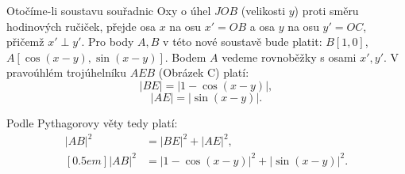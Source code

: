 \documentclass[12pt,a4paper]{article}
\begin{document}
\begin{center}
\end{center}


Otočíme-li soustavu souřadnic Oxy o úhel $JOB$ (velikosti $y$) proti směru hodinových ručiček, 
přejde osa $x$ na osu $x' = OB$ a osa $y$ na osu $y' = OC$, přičemž $x' \perp y'$.
Pro body $A, B$ v této nové soustavě bude platit: $B[1,0]$, $A[\cos(x - y), \sin(x - y)]$.
Bodem $A$ vedeme rovnoběžky s osami $x', y'$.
V pravoúhlém trojúhelníku $AEB$ (Obrázek C) platí:
\[
|BE| = |1 - \cos (x-y)|,
\]
\[
|AE| = |\sin (x-y)|.
\]

Podle Pythagorovy věty tedy platí:
\[
\begin{aligned}
|AB|^2 &= |BE|^2 + |AE|^2 , \\ [0.5em]
|AB|^2 &= |1 - \cos (x-y)|^2 + |\sin (x-y)|^2.    
\end{aligned}
\]
\end{document}
